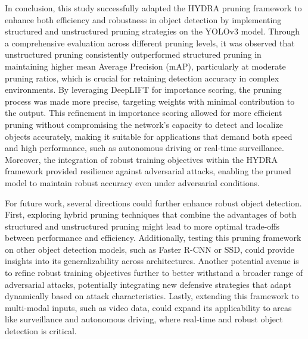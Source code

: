 \documentclass[journal,onecolumn,12pt]{IEEEtran}
\begin{document}
In conclusion, this study successfully adapted the HYDRA pruning framework to enhance both efficiency and robustness in object detection by implementing structured and unstructured pruning strategies on the YOLOv3 model. Through a comprehensive evaluation across different pruning levels, it was observed that unstructured pruning consistently outperformed structured pruning in maintaining higher mean Average Precision (mAP), particularly at moderate pruning ratios, which is crucial for retaining detection accuracy in complex environments. By leveraging DeepLIFT for importance scoring, the pruning process was made more precise, targeting weights with minimal contribution to the output. This refinement in importance scoring allowed for more efficient pruning without compromising the network's capacity to detect and localize objects accurately, making it suitable for applications that demand both speed and high performance, such as autonomous driving or real-time surveillance. Moreover, the integration of robust training objectives within the HYDRA framework provided resilience against adversarial attacks, enabling the pruned model to maintain robust accuracy even under adversarial conditions.

For future work, several directions could further enhance robust object detection. First, exploring hybrid pruning techniques that combine the advantages of both structured and unstructured pruning might lead to more optimal trade-offs between performance and efficiency. Additionally, testing this pruning framework on other object detection models, such as Faster R-CNN or SSD, could provide insights into its generalizability across architectures. Another potential avenue is to refine robust training objectives further to better withstand a broader range of adversarial attacks, potentially integrating new defensive strategies that adapt dynamically based on attack characteristics. Lastly, extending this framework to multi-modal inputs, such as video data, could expand its applicability to areas like surveillance and autonomous driving, where real-time and robust object detection is critical.



\end{document}
